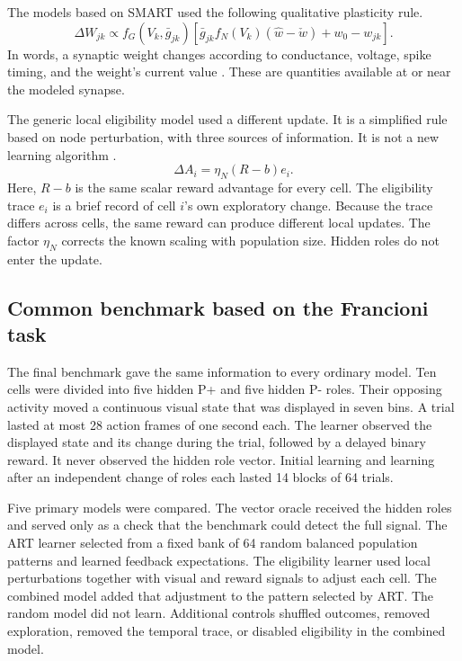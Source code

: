 \documentclass[11pt]{article}
\begin{document}
The models based on SMART used the following qualitative plasticity rule.
\begin{equation}
 \Delta W_{jk}\propto f_G(V_k,\bar g_{jk})\left[\bar g_{jk}f_N(V_k)(\widehat w-\check w)+w_0-w_{jk}\right].
\end{equation}
In words, a synaptic weight changes according to conductance, voltage, spike timing, and the weight's current value \citep{grossbergversace2008}. These are quantities available at or near the modeled synapse.

The generic local eligibility model used a different update. It is a simplified rule based on node perturbation, with three sources of information. It is not a new learning algorithm \citep{fiete2006,izhikevich2007,gerstner2018}.
\begin{equation}
 \Delta A_i=\eta_N(R-b)e_i.
\end{equation}
Here, $R-b$ is the same scalar reward advantage for every cell. The eligibility trace $e_i$ is a brief record of cell $i$'s own exploratory change. Because the trace differs across cells, the same reward can produce different local updates. The factor $\eta_N$ corrects the known scaling with population size. Hidden roles do not enter the update.

\subsection{Common benchmark based on the Francioni task}
The final benchmark gave the same information to every ordinary model. Ten cells were divided into five hidden P+ and five hidden P- roles. Their opposing activity moved a continuous visual state that was displayed in seven bins. A trial lasted at most 28 action frames of one second each. The learner observed the displayed state and its change during the trial, followed by a delayed binary reward. It never observed the hidden role vector. Initial learning and learning after an independent change of roles each lasted 14 blocks of 64 trials.

Five primary models were compared. The vector oracle received the hidden roles and served only as a check that the benchmark could detect the full signal. The ART learner selected from a fixed bank of 64 random balanced population patterns and learned feedback expectations. The eligibility learner used local perturbations together with visual and reward signals to adjust each cell. The combined model added that adjustment to the pattern selected by ART. The random model did not learn. Additional controls shuffled outcomes, removed exploration, removed the temporal trace, or disabled eligibility in the combined model.
\end{document}
